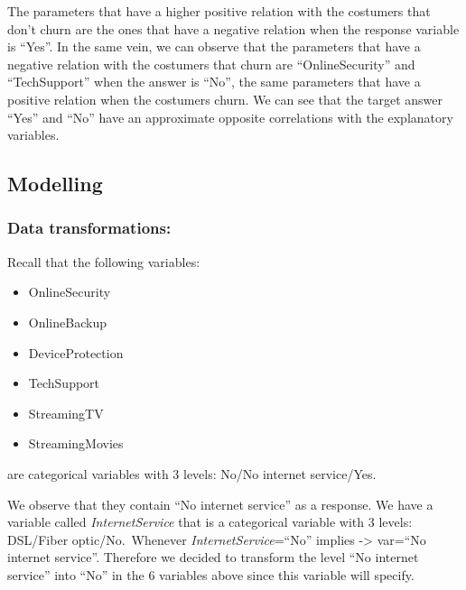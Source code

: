 \documentclass[
  twoside]{article}
\begin{document}
The parameters that have a higher positive relation with the costumers
that don't churn are the ones that have a negative relation when the
response variable is ``Yes''. In the same vein, we can observe that the
parameters that have a negative relation with the costumers that churn
are ``OnlineSecurity'' and ``TechSupport'' when the answer is ``No'',
the same parameters that have a positive relation when the costumers
churn. We can see that the target answer ``Yes'' and ``No'' have an
approximate opposite correlations with the explanatory variables.

\hypertarget{modelling}{%
\subsection{Modelling}\label{modelling}}

\hypertarget{data-transformations}{%
\subsubsection{Data transformations:}\label{data-transformations}}

Recall that the following variables:

\begin{itemize}
\item OnlineSecurity
\item OnlineBackup
\item DeviceProtection
\item TechSupport
\item StreamingTV
\item StreamingMovies
\end{itemize}

are categorical variables with 3 levels: No/No internet service/Yes.

We observe that they contain ``No internet service'' as a response. We
have a variable called \emph{InternetService} that is a categorical
variable with 3 levels: DSL/Fiber optic/No.~Whenever
\emph{InternetService}=``No'' implies -\textgreater{} var=``No internet
service''. Therefore we decided to transform the level ``No internet
service'' into ``No'' in the 6 variables above since this variable will
specify.
\end{document}
